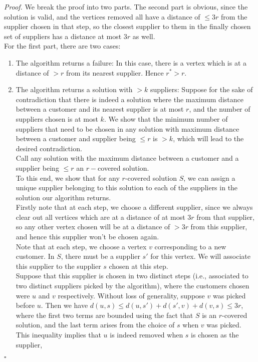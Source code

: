 \documentclass[a4paper]{article}
\newenvironment{proof}{\begin{breakbox}\textit{Proof.}}{\hfill$\square$\end{breakbox}}
\newcommand{\nl}{\vspace{0.2cm}\\}
\begin{document}
\begin{proof}
    We break the proof into two parts. The second part is obvious, since the solution is valid, and the vertices removed all have a distance of $\le 3r$ from the supplier chosen in that step, so the
    closest supplier to them in the finally chosen set of suppliers has a distance at most $3r$ as well.\nl
    For the first part, there are two cases:
    \begin{enumerate}
        \item The algorithm returns a failure: In this case, there is a vertex which is at a distance of $> r$ from its nearest supplier. Hence $r^* > r$.
        \item The algorithm returns a solution with $> k$ suppliers: Suppose for the sake of contradiction that there is indeed a solution where the maximum distance between a customer and its
            nearest supplier is at most $r$, and the number of suppliers chosen is at most $k$. We show that the minimum number of suppliers that need to be chosen in any solution with maximum distance between a
        customer and supplier being $\le r$ is $> k$, which will lead to the desired contradiction.\nl
        Call any solution with the maximum distance between a customer and a supplier being $\le r$ an $r-$covered solution.\nl
        To this end, we show that for any $r$-covered solution $S$, we can assign a unique supplier belonging to this solution to each of the suppliers in the solution our algorithm returns.\nl
        Firstly note that at each step, we choose a different supplier, since we always clear out all vertices which are at a distance of at most $3r$ from that supplier, so any other
        vertex chosen will be at a distance of $> 3r$ from this supplier, and hence this supplier won't be chosen again.\nl
        Note that at each step, we choose a vertex $v$ corresponding to a new customer. In $S$, there must be a supplier $s'$ for this vertex. We will associate this supplier to the supplier
        $s$ chosen at this step.\nl
        Suppose that this supplier is chosen in two distinct steps (i.e., associated to two distinct suppliers picked by the algorithm), where the customers chosen were $u$ and $v$ respectively.
        Without loss of generality, suppose $v$ was picked before $u$. Then we have $d(u, s) \le d(u, s') + d(s', v) + d(v, s) \le 3r$, where the first two terms are bounded using the fact that
        $S$ is an $r$-covered solution, and the last term arises from the choice of $s$ when $v$ was picked. This inequality implies that $u$ is indeed removed when $s$ is chosen as the supplier,

\end{enumerate}
\end{proof}
\end{document}
